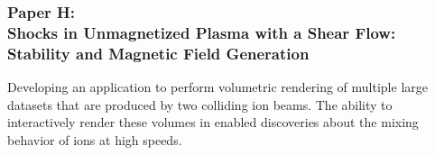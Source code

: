 \subsubsection{Paper H:\\Shocks in Unmagnetized Plasma with a Shear Flow: Stability and Magnetic Field Generation}
 Developing an application to perform volumetric rendering of multiple large datasets that are produced by two colliding ion beams. The ability to interactively render these volumes in  enabled discoveries about the mixing behavior of ions at high speeds. %

